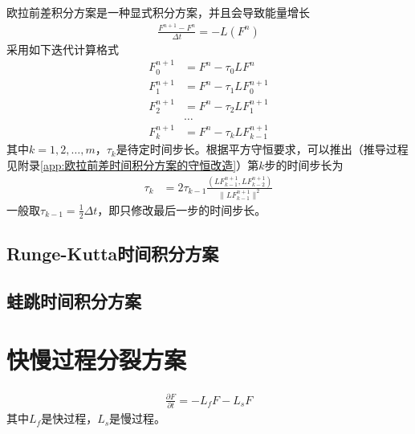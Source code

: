 \documentclass{ctexart}
\begin{document}
欧拉前差积分方案是一种显式积分方案，并且会导致能量增长
\begin{align}
  \frac{F^{n+1} - F^n}{\Delta{t}} = - L \left( F^n \right)
\end{align}
采用如下迭代计算格式
\begin{align*}
  F_0^{n+1} & = F^n - \tau_0 L F^n \\
  F_1^{n+1} & = F^n - \tau_1 L F_0^{n+1} \\
  F_2^{n+1} & = F^n - \tau_2 L F_1^{n+1} \\
  & \dots \\
  F_k^{n+1} & = F^n - \tau_k L F_{k-1}^{n+1}
\end{align*}
其中$k = 1, 2, \dots, m$，$\tau_k$是待定时间步长。根据平方守恒要求，可以推出（推导过程见附录\ref{app:欧拉前差时间积分方案的守恒改造}）第$k$步的时间步长为
\begin{align}
  \tau_k & = 2 \tau_{k-1} \frac{\left( L F_{k-1}^{n+1}, L F_{k-2}^{n+1} \right)}{\lVert L F_{k-1}^{n+1} \rVert^2}
\end{align}
一般取$\tau_{k-1} = \frac{1}{2} \Delta{t}$，即只修改最后一步的时间步长。

\subsection{Runge-Kutta时间积分方案}

\subsection{蛙跳时间积分方案}

\section{快慢过程分裂方案}

\begin{align}
  \frac{\partial F}{\partial t} = - L_f F - L_s F
\end{align}
其中$L_f$是快过程，$L_s$是慢过程。
\end{document}
